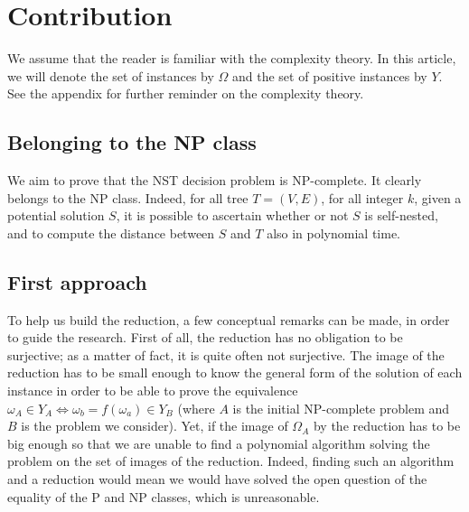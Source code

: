 \newcommand\variable{\emph{variable}\xspace}
\newcommand\variables{\emph{variables}\xspace}
\newcommand\widget{\emph{widget}\xspace}
\newcommand\widgets{\emph{widgets}\xspace}
\newcommand\constraint{\emph{constraint}\xspace}
\newcommand\constraints{\emph{constraints}\xspace}

\section{Contribution}

We assume that the reader is familiar with the complexity theory. In
this article, we will denote the set of instances by $\Omega$ and the
set of positive instances by $Y$. See the appendix for further
reminder on the complexity theory.

\subsection{Belonging to the NP class}

We aim to prove that the NST decision problem is NP-complete. It
clearly belongs to the NP class. Indeed, for all tree $T = (V,E)$, for
all integer $k$, given a potential solution $S$, it is possible to
ascertain whether or not $S$ is self-nested, and to compute the
distance between $S$ and $T$ also in polynomial time.

\noindent\hrulefill

\subsection{First approach}
To help us build the reduction, a few conceptual remarks can be made,
in order to guide the research. First of all, the reduction has no
obligation to be surjective; as a matter of fact, it is quite often
not surjective. The image of the reduction has to be small enough to know the
general form of the solution of each instance in order to be able to
prove the equivalence
$\omega_{A} \in Y_{A} \Leftrightarrow \omega_{b} = f(\omega_{a}) \in Y_{B}$ (where
$A$ is the initial NP-complete problem and $B$ is the problem we
consider). Yet, if the image of $\Omega_{A}$ by the reduction has to
be big enough so that we are unable to find a polynomial algorithm
solving the problem on the set of images of the reduction. Indeed,
finding such an algorithm and a reduction would mean we would have
solved the open question of the equality of the P and NP classes,
which is unreasonable.

